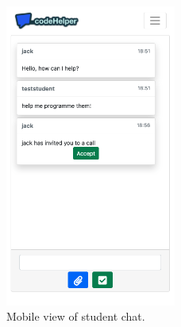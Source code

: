 \begin{figure}[H]
    \centering
    \includegraphics[width=0.5\textwidth]{8implementation/images/mobStudChat.png}
    \caption{Mobile view of student chat.}
    \label{fig:mobStudChat}
\end{figure}

